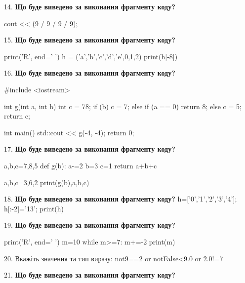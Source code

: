 \documentclass[11pt]{article}
\begin{document}
14. \textbf{Що буде виведено за виконання фрагменту коду?}

cout << (9 / 9 / 9 / 9);
\par\vspace{5mm}

15. \textbf{Що буде виведено за виконання фрагменту коду?}

print('R', end=' ')
h = ('a','b','c','d','e',0,1,2)
print(h[-8])

\par\vspace{5mm}

16. \textbf{Що буде виведено за виконання фрагменту коду?}

#include <iostream>

int g(int a, int b){
    int c = 78;
    if (b)
        c = 7;
    else if (a == 0)
         return 8;
    else 
        c = 5;
    return c;
}

int main(){
    std::cout << g(-4, -4);
    return 0;
}
\par\vspace{5mm}

17. \textbf{Що буде виведено за виконання фрагменту коду?}

a,b,c=7,8,5
def g(b):
    a-=2
    b=3
    c=1
    return a+b+c

a,b,c=3,6,2
print(g(b),a,b,c)
\par\vspace{5mm}

18. \textbf{Що буде виведено за виконання фрагменту коду?}
h=['0','1','2','3','4']; h[:-2]='13'; print(h)\par\vspace{5mm}

19. \textbf{Що буде виведено за виконання фрагменту коду?}

print('R', end=' ')
m=10
while m>=7:
    m+=-2
print(m)

\par\vspace{5mm}

20. 
Вкажіть значення та тип виразу:
not9==2 or notFalse<9.0 or 2.0!=7
\par\vspace{5mm}

21. \textbf{Що буде виведено за виконання фрагменту коду?}
\end{document}
